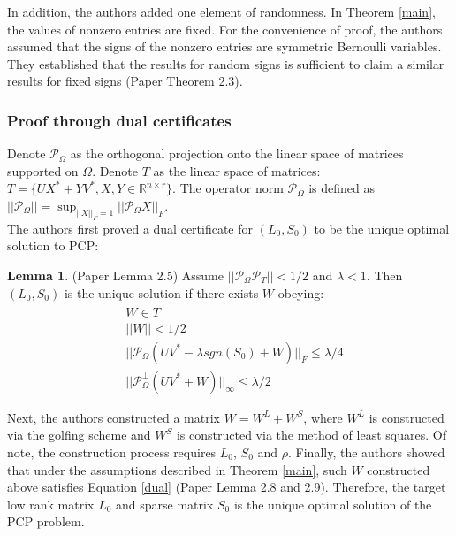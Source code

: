 \documentclass[12pt]{extarticle}
\newcommand{\<}{\langle}
\renewcommand{\>}{\rangle}
\theoremstyle{definition}
\newtheorem{lemma}{Lemma}
\begin{document}
In addition, the authors added one element of randomness. In Theorem \ref{main}, the values of nonzero entries are fixed. For the convenience of proof, the authors assumed that the signs of the nonzero entries are symmetric Bernoulli variables. They established that the results for random signs is sufficient to claim a similar results for fixed signs (Paper Theorem 2.3). 


\subsubsection{Proof through dual certificates}
Denote $\mathcal{P}_\Omega$ as the orthogonal projection onto the linear space of matrices supported on $\Omega$. Denote $T$ as the linear space of matrices: $T = \{UX^*+YV^*, X,Y \in \mathbb{R}^{n \times r}\}$. The operator norm $\mathcal{P}_\Omega$ is defined as $||\mathcal{P}_\Omega || = \sup_{||X||_F=1}||\mathcal{P}_\Omega X||_F$. \\

The authors first proved a dual certificate for $(L_0,S_0)$ to be the unique optimal solution to PCP: 
\begin{lemma}
(Paper Lemma 2.5) Assume $||\mathcal{P}_\Omega \mathcal{P}_T|| < 1/2$ and $\lambda<1$. Then $(L_0,S_0)$ is the unique solution if there exists $W$ obeying: 
\begin{equation}
\label{dual}
\begin{split}
    & W \in T^\perp \\
    & ||W|| < 1/2 \\
    & ||\mathcal{P}_\Omega(UV^* - \lambda sgn(S_0) +W)||_F  \leq \lambda/4 \\
    & ||\mathcal{P}_\Omega^\perp (UV^*+W)||_\infty  \leq \lambda/2
\end{split}
\end{equation}
\end{lemma}
Next, the authors constructed a matrix $W = W^L + W^S$, where $W^L$ is constructed via the golfing scheme and $W^S$ is constructed via the method of least squares. Of note, the construction process requires $L_0$, $S_0$ and $\rho$. Finally, the authors showed that under the assumptions described in Theorem \ref{main}, such $W$ constructed above satisfies Equation \ref{dual} (Paper Lemma 2.8 and 2.9). Therefore, the target low rank matrix $L_0$ and sparse matrix $S_0$ is the unique optimal solution of the PCP problem. 
\end{document}
